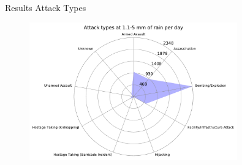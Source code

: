 \documentclass{beamer}
\begin{document}
\begin{frame}{Results}
	Attack Types
	
	\begin{figure}
		\includegraphics[width=0.8\textwidth]{Rain-Attack/rain11-5_starDiagram}
	\end{figure}
	
\end{frame}
\end{document}
